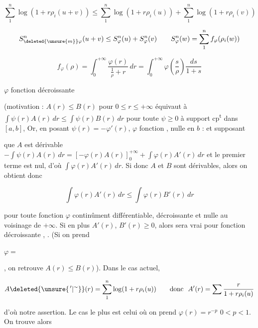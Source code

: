 \[
\sum_1^n\log(1+r\rho_i(u+v))\leq\sum_1^n\log(1+r\rho_i(u))+\sum_1^n\log(1+r\rho_i(v))
\]

\[
S_{\deleted{\unsure{m}}\varphi}^{n}(u+v)\leq S_\varphi^n(u)+S_\varphi^n(v)\qquad S_\varphi^n(w)=\sum_1^n f_\varphi(\rho_i(w))
\]

\[
f_\varphi(\rho)=\int_0^{+\infty}\frac{\varphi(r)}{\frac1\rho+r}\,dr=\int_0^{+\infty}\varphi\left(\frac s\rho\right)\frac{ds}{1+s}
\]

$\varphi$ fonction décroissante

(motivation :  $A(r)\leq B(r)$ pour $0\leq r\leq+\infty$ équivaut à $\int\psi(r)A(r)\,dr\leq\int\psi(r)B(r)\,dr$ pour toute $\psi\geq0$ à support cp\textsuperscript{t} dans $[a,b]$, Or, en posant $\psi(r)=-\varphi'(r)$, $\varphi$ fonction  , nulle en $b$ :   et supposant 

que $A$ est dérivable $-\int\psi(r)A(r)\,dr=[-\varphi(r)A(r)]_0^{+\infty}+\int\varphi(r)A'(r)\,dr$ et le premier terme est nul, d'où $\int\varphi(r)A'(r)\,dr$. Si donc $A$ et $B$ sont dérivables, alors on obtient donc

\[
\int\varphi(r)A'(r)\,dr\leq\int\varphi(r)B'(r)\,dr
\]

pour toute fonction $\varphi$ continûment différentiable, décroissante \inserted{sur $[0,+\infty[$} et nulle au voisinage de $+\infty$. Si en plus $A'(r)$, $B'(r)\geq0$, alors  sera vrai pour  fonction décroissante ,   . (Si on prend

$\varphi=$


, on retrouve $A(r)\leq B(r)$). Dans le cas actuel,

\[
A\deleted{\unsure{^{\,\prime}|{}^{\sim}}}(r)=\sum_1^n\log(1+r\rho_i(u))\qquad \text{donc }\ A'(r)=\sum\frac{r}{1+r\rho_i(u)}
\]

d'où notre assertion. Le cas le plus  est celui où on prend $\varphi(r)=r^{-p}$ $0<p<1$. On trouve alors
